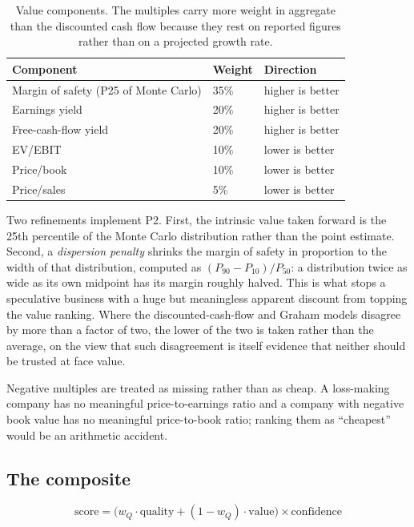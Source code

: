 \documentclass[11pt,a4paper]{article}
\begin{document}
\begin{table}[h]
\centering
\sffamily\small
\begin{tabular}{@{}lll@{}}
\toprule
\textbf{Component} & \textbf{Weight} & \textbf{Direction}\\
\midrule
Margin of safety (P25 of Monte Carlo) & 35\% & higher is better\\
Earnings yield & 20\% & higher is better\\
Free-cash-flow yield & 20\% & higher is better\\
EV/EBIT & 10\% & lower is better\\
Price/book & 10\% & lower is better\\
Price/sales & 5\% & lower is better\\
\bottomrule
\end{tabular}
\caption{Value components. The multiples carry more weight in aggregate than
the discounted cash flow because they rest on reported figures rather than on a
projected growth rate.}
\end{table}

Two refinements implement P2. First, the intrinsic value taken forward is the
25th percentile of the Monte Carlo distribution rather than the point estimate.
Second, a \emph{dispersion penalty} shrinks the margin of safety in proportion
to the width of that distribution, computed as $(P_{90}-P_{10})/P_{50}$: a
distribution twice as wide as its own midpoint has its margin roughly halved.
This is what stops a speculative business with a huge but meaningless apparent
discount from topping the value ranking. Where the discounted-cash-flow and
Graham models disagree by more than a factor of two, the lower of the two is
taken rather than the average, on the view that such disagreement is itself
evidence that neither should be trusted at face value.

Negative multiples are treated as missing rather than as cheap. A loss-making
company has no meaningful price-to-earnings ratio and a company with negative
book value has no meaningful price-to-book ratio; ranking them as ``cheapest''
would be an arithmetic accident.

\subsection{The composite}

\[
\text{score} = \bigl(w_Q \cdot \text{quality} + (1-w_Q) \cdot \text{value}\bigr)
\times \text{confidence}
\]
\end{document}
